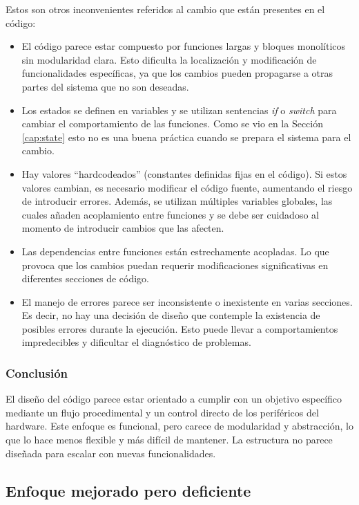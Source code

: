 Estos son otros inconvenientes referidos al cambio que están presentes en el código:
\begin{itemize}
\item El código parece estar compuesto por funciones largas y bloques monolíticos sin modularidad clara. Esto dificulta la localización y modificación de funcionalidades específicas, ya que los cambios pueden propagarse a otras partes del sistema que no son deseadas.
\item Los estados se definen en variables y se utilizan sentencias \textit{if} o \textit{switch} para cambiar el comportamiento de las funciones. Como se vio en la Sección \ref{cap:state} esto no es una buena práctica cuando se prepara el sistema para el cambio.
\item Hay valores ``hardcodeados'' (constantes definidas fijas en el código). Si estos valores cambian, es necesario modificar el código fuente, aumentando el riesgo de introducir errores. Además, se utilizan múltiples variables globales, las cuales añaden acoplamiento entre funciones y se debe ser cuidadoso al momento de introducir cambios que las afecten.
\item Las dependencias entre funciones están estrechamente acopladas. Lo que provoca que los cambios puedan requerir modificaciones significativas en diferentes secciones de código.
\item El manejo de errores parece ser inconsistente o inexistente en varias secciones. Es decir, no hay una decisión de diseño que contemple la existencia de posibles errores durante la ejecución. Esto puede llevar a comportamientos impredecibles y dificultar el diagnóstico de problemas.
\end{itemize}

\subsubsection*{Conclusión}

El diseño del código parece estar orientado a cumplir con un objetivo específico mediante un flujo procedimental y un control directo de los periféricos del hardware. Este enfoque es funcional, pero carece de modularidad y abstracción, lo que lo hace menos flexible y más difícil de mantener. La estructura no parece diseñada para escalar con nuevas funcionalidades.

\subsection*{Enfoque mejorado pero deficiente}

